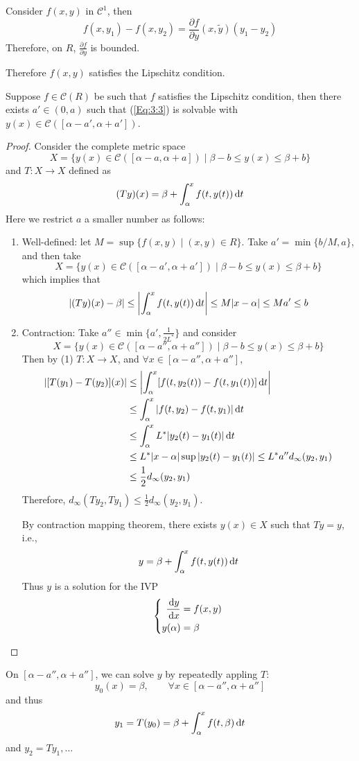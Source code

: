 \begin{example}
Consider $f(x,y)$ in $\mathcal{C}^1$, then
\[
f(x,y_1)-f(x,y_2)=\frac{\partial f}{\partial y}(x,\tilde y)(y_1-y_2)
\]
Therefore, on $R$, $\frac{\partial f}{\partial y}$ is bounded.

Therefore $f(x,y)$ satisfies the Lipschitz condition.
\end{example}

\begin{theorem}
Suppose $f\in\mathcal{C}(R)$ be such that $f$ satisfies the Lipschitz condition, then there exists $a'\in(0,a)$ such that (\ref{Eq:3:3}) is solvable with $y(x)\in\mathcal{C}([\alpha-a',\alpha+a'])$. 
\end{theorem}
\begin{proof}
Consider the complete metric space
\[
X=\{y(x)\in \mathcal{C}([\alpha-a,\alpha+a])
\mid\beta-b\le y(x)\le\beta+b
\}
\]
and $T:X\to X$ defined as
\[
(Ty)(x)=\beta
+
\int_\alpha^xf(t,y(t))\,\mathrm{d} t
\]
Here we restrict $a$ a smaller number as follows:
\begin{enumerate}
\item
Well-defined: let $M=\sup\{f(x,y)\mid (x,y)\in R\}$. Take $a'=\min\{b/M,a\}$, and then take
\[
X=\{y(x)\in \mathcal{C}([\alpha-a',\alpha+a'])
\mid\beta-b\le y(x)\le\beta+b
\}
\]
which implies that 
\[
|(Ty)(x)-\beta|\le 
\left|\int_\alpha^xf(t,y(t))\,\mathrm{d} t\right|
\le M|x-\alpha|\le Ma'\le b
\]
\item
Contraction: Take $a''\in\min\{a',\frac{1}{2L^*}\}$ and consider
\[
X=\{y(x)\in \mathcal{C}([\alpha-a'',\alpha+a''])
\mid\beta-b\le y(x)\le\beta+b
\}
\]
Then by (1) $T:X\to X$, and $\forall x\in[\alpha-a'',\alpha+a'']$,
\begin{align*}
|[T(y_1)-T(y_2)](x)|&\le
\left|
\int_\alpha^x[f(t,y_2(t))-f(t,y_1(t))]\,\mathrm{d} t
\right|\\
&\le\int_\alpha^x|f(t,y_2)-f(t,y_1)|\,\mathrm{d} t\\
&\le\int_\alpha^xL^*|y_2(t)-y_1(t)|\,\mathrm{d} t\\
&\le L^*|x-\alpha|\sup|y_2(t)-y_1(t)|
\le L^*a''d_\infty(y_2,y_1)\\
&\le\frac{1}{2}d_\infty(y_2,y_1)
\end{align*}
Therefore, $d_\infty(Ty_2,Ty_1)\le\frac{1}{2}d_\infty(y_2,y_1)$.

By contraction mapping theorem, there exists $y(x)\in X$ such that $Ty=y$, i.e.,
\[
y=\beta+\int_\alpha^xf(t,y(t))\,\mathrm{d} t
\]
Thus $y$ is a solution for the IVP
\[
\left\{
\begin{aligned}
\frac{\,\mathrm{d} y}{\,\mathrm{d} x}&=f(x,y)\\
y(\alpha)&=\beta
\end{aligned}
\right.
\]
\end{enumerate}

\end{proof}
\begin{remark}
On $[\alpha-a'',\alpha+a'']$, we can solve $y$ by repeatedly appling $T$:
\[
y_0(x)=\beta,\qquad
\forall x\in[\alpha-a'',\alpha+a'']
\]
and thus
\[
y_1=T(y_0)=\beta+\int_\alpha^xf(t,\beta)\,\mathrm{d} t
\]
and $y_2=Ty_1,\dots$
\end{remark}

